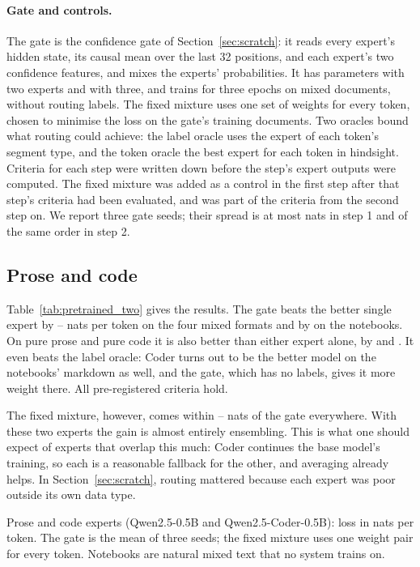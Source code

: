 \documentclass[10pt]{article}
\newcommand{\pending}[1]{{\color{red}\textbf{[#1]}}}
\begin{document}
\paragraph{Gate and controls.} The gate is the confidence gate of Section~\ref{sec:scratch}:
it reads every expert's hidden state, its causal mean over the last 32 positions, and each
expert's two confidence features, and mixes the experts' probabilities. It has
\resTrackBOneGateParams{} parameters with two experts and \resTrackBCleanGateParams{} with
three, and trains for three epochs on mixed documents, without routing labels. The fixed
mixture uses one set of weights for every token, chosen to minimise the loss on the gate's
training documents. Two oracles bound what routing could achieve: the label oracle uses the
expert of each token's segment type, and the token oracle the best expert for each token in
hindsight. Criteria for each step were written down before the step's expert outputs were
computed. The fixed mixture was added as a control in the first step after that step's criteria
had been evaluated, and was part of the criteria from the second step on. We report three gate seeds; their spread is at most \resTrackBOneSeedSdMax{} nats
in step 1 and of the same order in step 2.

\subsection{Prose and code}
\label{sec:pretrained_two}

Table~\ref{tab:pretrained_two} gives the results. The gate beats the better single expert by
\resTrackBOneMixedMarginMin--\resTrackBOneMixedMarginMax{} nats per token on the four mixed
formats and by \resTrackBOneNotebookMargin{} on the notebooks. On pure prose and pure code it
is also better than either expert alone, by \resTrackBOneProseMargin{} and
\resTrackBOneCodeMargin{}. It even beats the label oracle: Coder turns out to be the better
model on the notebooks' markdown as well, and the gate, which has no labels, gives it more
weight there. All pre-registered criteria hold.

The fixed mixture, however, comes within \resTrackBOneConstGapMin--\resTrackBOneConstGapMax{}
nats of the gate everywhere. With these two experts the gain is almost entirely ensembling.
This is what one should expect of experts that overlap this much: Coder continues the base
model's training, so each is a reasonable fallback for the other, and averaging already
helps. In Section~\ref{sec:scratch}, routing mattered because each expert was poor outside
its own data type.
\begin{table}[t]
\centering\small
\caption{Prose and code experts (Qwen2.5-0.5B and Qwen2.5-Coder-0.5B): loss in nats per
token. The gate is the mean of three seeds; the fixed mixture uses one weight pair for every
token. Notebooks are natural mixed text that no system trains on.}
\label{tab:pretrained_two}
\IfFileExists{tables/track_b_step1.tex}{}{\pending{table}}
\end{table}
\end{document}
